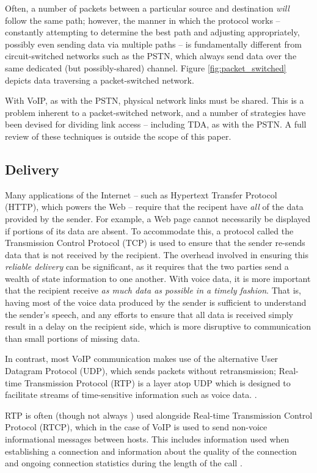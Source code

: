 \documentclass[11pt]{article}
\newcommand{\term}[1]{\textit{#1}}
\begin{document}
Often, a number of packets between a particular source and destination
\emph{will} follow the same path; however, the manner in which the protocol
works -- constantly attempting to determine the best path and adjusting
appropriately, possibly even sending data via multiple paths -- is fundamentally
different from circuit-switched networks such as the PSTN, which always send
data over the same dedicated (but possibly-shared) channel. \cite{packets}
Figure \ref{fig:packet_switched} depicts data traversing a packet-switched
network.

With VoIP, as with the PSTN, physical network links must be shared. This is a
problem inherent to a packet-switched network, and a number of strategies have
been devised for dividing link access -- including TDA, as with the PSTN. A full
review of these techniques is outside the scope of this paper.

\subsection{Delivery}
\label{sec:voipdelivery}

Many applications of the Internet -- such as Hypertext Transfer Protocol (HTTP),
which powers the Web -- require that the recipent have \emph{all} of the data
provided by the sender. For example, a Web page cannot necessarily be displayed
if portions of its data are absent. To accommodate this, a protocol called the
Transmission Control Protocol (TCP) is used to ensure that the sender re-sends
data that is not received by the recipient. The overhead involved in ensuring
this \term{reliable delivery} can be significant, as it requires that the two
parties send a wealth of state information to one another. With voice data, it
is more important that the recipient receive \emph{as much data as possible in a
timely fashion}. That is, having most of the voice data produced by the sender
is sufficient to understand the sender's speech, and any efforts to ensure that
all data is received simply result in a delay on the recipient side, which is
more disruptive to communication than small portions of missing data.
\cite{goode}

In contrast, most VoIP communication makes use of the alternative User Datagram
Protocol (UDP), which sends packets without retransmission; Real-time
Transmission Protocol (RTP) is a layer atop UDP which is designed to facilitate
streams of time-sensitive information such as voice data. \cite{goode,rtp_voip}. 

RTP is often (though not always \cite{goode}) used alongside Real-time
Transmission Control Protocol (RTCP), which in the case of VoIP is used to send
non-voice informational messages between hosts. This includes information used
when establishing a connection and information about the quality of the
connection and ongoing connection statistics during the length of the call
\cite{voipinfo_rtp,rtp_voip}.
\end{document}
